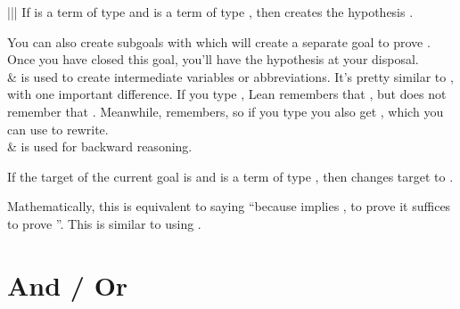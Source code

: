 \documentclass[letterpaper,10pt,english]{sphinxmanual}
\begin{document}
\begin{savenotes}
\begin{tabular}[t]{|||}
\sphinxAtStartPar
If  is a term of type  and
 is a term of type , then
 creates the hypothesis  .

\sphinxAtStartPar
You can also create subgoals with  which will create a separate goal to prove .
Once you have closed this goal, you’ll have the hypothesis  at your disposal.
\\
\hline
\sphinxAtStartPar
{}
&
\sphinxAtStartPar
{} is used to create intermediate variables or abbreviations.
It’s pretty similar to , with one important difference.
If you type , Lean remembers that , but
does not remember that .
Meanwhile,  remembers, so if you type  you also get ,
which you can use to rewrite.
\\
\hline
\sphinxAtStartPar
{}
&
\sphinxAtStartPar
{} is used for backward reasoning.

\sphinxAtStartPar
If the target of the current goal is  and
 is a term of type , then
 changes target to .

\sphinxAtStartPar
Mathematically, this is equivalent to saying “because  implies , to prove  it suffices to prove ”.
This is similar to using .
\\
\hline
\end{tabular}
\par
\sphinxattableend\end{savenotes}


\section{And / Or}
\label{\detokenize{tactics:and-or}}
\end{document}
